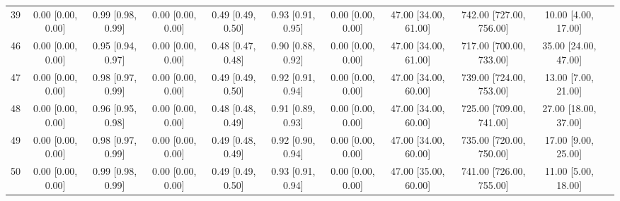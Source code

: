 \documentclass[8pt]{article}
\begin{document}
\begin{center}
\begin{footnotesize}
\begin{longtable}{|ccccccccccc|}
 39 &  0.00 [0.00, 0.00] &  0.99 [0.98, 0.99] &  0.00 [0.00, 0.00] &  0.49 [0.49, 0.50] &  0.93 [0.91, 0.95] &     0.00 [0.00, 0.00] &  47.00 [34.00, 61.00] &  742.00 [727.00, 756.00] &      10.00 [4.00, 17.00] \\
 46 &  0.00 [0.00, 0.00] &  0.95 [0.94, 0.97] &  0.00 [0.00, 0.00] &  0.48 [0.47, 0.48] &  0.90 [0.88, 0.92] &     0.00 [0.00, 0.00] &  47.00 [34.00, 61.00] &  717.00 [700.00, 733.00] &     35.00 [24.00, 47.00] \\
 47 &  0.00 [0.00, 0.00] &  0.98 [0.97, 0.99] &  0.00 [0.00, 0.00] &  0.49 [0.49, 0.50] &  0.92 [0.91, 0.94] &     0.00 [0.00, 0.00] &  47.00 [34.00, 60.00] &  739.00 [724.00, 753.00] &      13.00 [7.00, 21.00] \\
 48 &  0.00 [0.00, 0.00] &  0.96 [0.95, 0.98] &  0.00 [0.00, 0.00] &  0.48 [0.48, 0.49] &  0.91 [0.89, 0.93] &     0.00 [0.00, 0.00] &  47.00 [34.00, 60.00] &  725.00 [709.00, 741.00] &     27.00 [18.00, 37.00] \\
 49 &  0.00 [0.00, 0.00] &  0.98 [0.97, 0.99] &  0.00 [0.00, 0.00] &  0.49 [0.48, 0.49] &  0.92 [0.90, 0.94] &     0.00 [0.00, 0.00] &  47.00 [34.00, 60.00] &  735.00 [720.00, 750.00] &      17.00 [9.00, 25.00] \\
 50 &  0.00 [0.00, 0.00] &  0.99 [0.98, 0.99] &  0.00 [0.00, 0.00] &  0.49 [0.49, 0.50] &  0.93 [0.91, 0.94] &     0.00 [0.00, 0.00] &  47.00 [35.00, 60.00] &  741.00 [726.00, 755.00] &      11.00 [5.00, 18.00] \\
\end{longtable}
\end{footnotesize}
\end{center}
\end{document}
